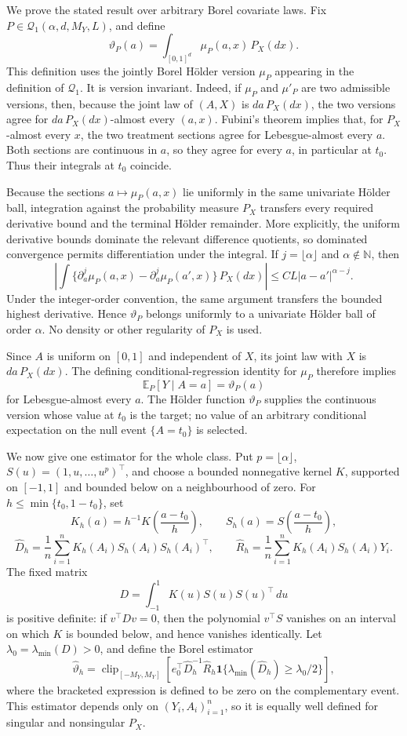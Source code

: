 We prove the stated result over arbitrary Borel covariate laws. Fix \(P\in\mathcal Q_1(\alpha,d,M_Y,L)\), and define
\[
\vartheta_P(a)=\int_{[0,1]^d}\mu_P(a,x)\,P_X(dx).
\]
This definition uses the jointly Borel H\"older version \(\mu_P\) appearing in the definition of \(\mathcal Q_1\). It is version invariant. Indeed, if \(\mu_P\) and \(\mu'_P\) are two admissible versions, then, because the joint law of \((A,X)\) is \(da\,P_X(dx)\), the two versions agree for \(da\,P_X(dx)\)-almost every \((a,x)\). Fubini's theorem implies that, for \(P_X\)-almost every \(x\), the two treatment sections agree for Lebesgue-almost every \(a\). Both sections are continuous in \(a\), so they agree for every \(a\), in particular at \(t_0\). Thus their integrals at \(t_0\) coincide.

Because the sections \(a\mapsto\mu_P(a,x)\) lie uniformly in the same univariate H\"older ball, integration against the probability measure \(P_X\) transfers every required derivative bound and the terminal H\"older remainder. More explicitly, the uniform derivative bounds dominate the relevant difference quotients, so dominated convergence permits differentiation under the integral. If \(j=\lfloor\alpha\rfloor\) and \(\alpha\notin\mathbb N\), then
\[
\left\lvert\int\{\partial_a^j\mu_P(a,x)-\partial_a^j\mu_P(a',x)\}\,P_X(dx)\right\rvert
\le C L\lvert a-a'\rvert^{\alpha-j}.
\]
Under the integer-order convention, the same argument transfers the bounded highest derivative. Hence \(\vartheta_P\) belongs uniformly to a univariate H\"older ball of order \(\alpha\). No density or other regularity of \(P_X\) is used.

Since \(A\) is uniform on \([0,1]\) and independent of \(X\), its joint law with \(X\) is \(da\,P_X(dx)\). The defining conditional-regression identity for \(\mu_P\) therefore implies
\[
\mathbb E_P[Y\mid A=a]=\vartheta_P(a)
\]
for Lebesgue-almost every \(a\). The H\"older function \(\vartheta_P\) supplies the continuous version whose value at \(t_0\) is the target; no value of an arbitrary conditional expectation on the null event \(\{A=t_0\}\) is selected.

We now give one estimator for the whole class. Put \(p=\lfloor\alpha\rfloor\), \(S(u)=(1,u,\ldots,u^p)^\top\), and choose a bounded nonnegative kernel \(K\), supported on \([-1,1]\) and bounded below on a neighbourhood of zero. For \(h\le\min\{t_0,1-t_0\}\), set
\[
K_h(a)=h^{-1}K\!\left(\frac{a-t_0}{h}\right),
\qquad
S_h(a)=S\!\left(\frac{a-t_0}{h}\right),
\]
\[
\widehat D_h=\frac1n\sum_{i=1}^nK_h(A_i)S_h(A_i)S_h(A_i)^\top,
\qquad
\widehat R_h=\frac1n\sum_{i=1}^nK_h(A_i)S_h(A_i)Y_i.
\]
The fixed matrix
\[
D=\int_{-1}^1K(u)S(u)S(u)^\top\,du
\]
is positive definite: if \(v^\top Dv=0\), then the polynomial \(v^\top S\) vanishes on an interval on which \(K\) is bounded below, and hence vanishes identically. Let \(\lambda_0=\lambda_{\min}(D)>0\), and define the Borel estimator
\[
\widehat\vartheta_h=
\operatorname{clip}_{[-M_Y,M_Y]}
\left[
 e_0^\top\widehat D_h^{-1}\widehat R_h
 \mathbf 1\{\lambda_{\min}(\widehat D_h)\ge\lambda_0/2\}
\right],
\]
where the bracketed expression is defined to be zero on the complementary event. This estimator depends only on \((Y_i,A_i)_{i=1}^n\), so it is equally well defined for singular and nonsingular \(P_X\).


